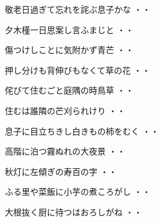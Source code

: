 \begin{shiika}敬老日過ぎて忘れを詫ぶ息子かな
\hfill{・・}\end{shiika}
\vspace{0.6cm}
\begin{shiika}夕木槿一日思案し言ふまじと
\hfill{・・}\end{shiika}
\vspace{0.6cm}
\begin{shiika}傷つけしことに気附かず青芒
\hfill{・・}\end{shiika}
\vspace{0.6cm}
\begin{shiika}押し分けも背伸びもなくて草の花
\hfill{・・}\end{shiika}
\vspace{0.6cm}
\begin{shiika}侘びて住むごと庭隅の時鳥草
\hfill{・・}\end{shiika}
\vspace{0.6cm}
\begin{shiika}住むは誰隣の芒刈られけり
\hfill{・・}\end{shiika}
\vspace{0.6cm}
\begin{shiika}息子に目立ちきし白きもの柿をむく
\hfill{・・}\end{shiika}
\vspace{0.6cm}
\begin{shiika}高階に泊つ霧ぬれの大夜景
\hfill{・・}\end{shiika}
\vspace{0.6cm}
\begin{shiika}秋灯に左傾ぎの寿百の字
\hfill{・・}\end{shiika}
\vspace{0.6cm}
\begin{shiika}ふる里や菜飯に小芋の煮ころがし
\hfill{・・}\end{shiika}
\vspace{0.6cm}
\begin{shiika}大根抜く厨に待つはおろしがね
\hfill{・・}\end{shiika}
\vspace{0.6cm}
